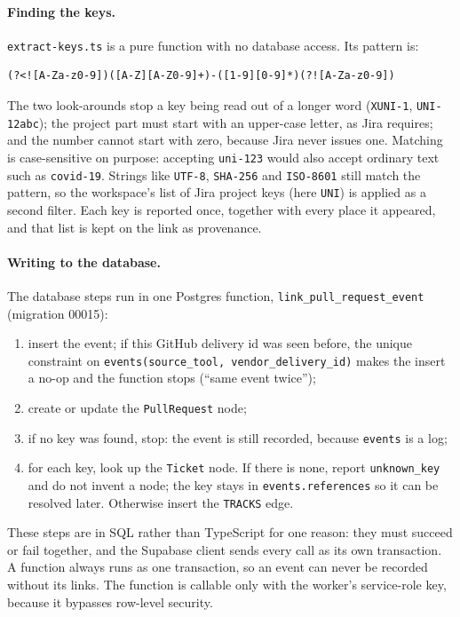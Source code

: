 \paragraph{Finding the keys.} \texttt{extract-keys.ts} is a pure function with
no database access. Its pattern is:
{\small
\begin{verbatim}
(?<![A-Za-z0-9])([A-Z][A-Z0-9]+)-([1-9][0-9]*)(?![A-Za-z0-9])
\end{verbatim}
}
\noindent The two look-arounds stop a key being read out of a longer word
(\texttt{XUNI-1}, \texttt{UNI-12abc}); the project part must start with an
upper-case letter, as Jira requires; and the number cannot start with zero,
because Jira never issues one. Matching is case-sensitive on purpose:
accepting \texttt{uni-123} would also accept ordinary text such as
\texttt{covid-19}. Strings like \texttt{UTF-8}, \texttt{SHA-256} and
\texttt{ISO-8601} still match the pattern, so the workspace's list of Jira
project keys (here \texttt{UNI}) is applied as a second filter. Each key is
reported once, together with every place it appeared, and that list is kept
on the link as provenance.

\paragraph{Writing to the database.} The database steps run in one Postgres
function, \texttt{link\_\allowbreak{}pull\_\allowbreak{}request\_\allowbreak{}event} (migration 00015):
\begin{enumerate}
  \item insert the event; if this GitHub delivery id was seen before, the
        unique constraint on \texttt{events(source\_tool, vendor\_delivery\_id)}
        makes the insert a no-op and the function stops (``same event twice'');
  \item create or update the \texttt{PullRequest} node;
  \item if no key was found, stop: the event is still recorded, because
        \texttt{events} is a log;
  \item for each key, look up the \texttt{Ticket} node. If there is none, report
        \texttt{unknown\_key} and do not invent a node; the key stays in
        \texttt{events.references} so it can be resolved later. Otherwise
        insert the \texttt{TRACKS} edge.
\end{enumerate}
These steps are in SQL rather than TypeScript for one reason: they must
succeed or fail together, and the Supabase client sends every call as its own
transaction. A function always runs as one transaction, so an event can never
be recorded without its links. The function is callable only with the
worker's service-role key, because it bypasses row-level security.

